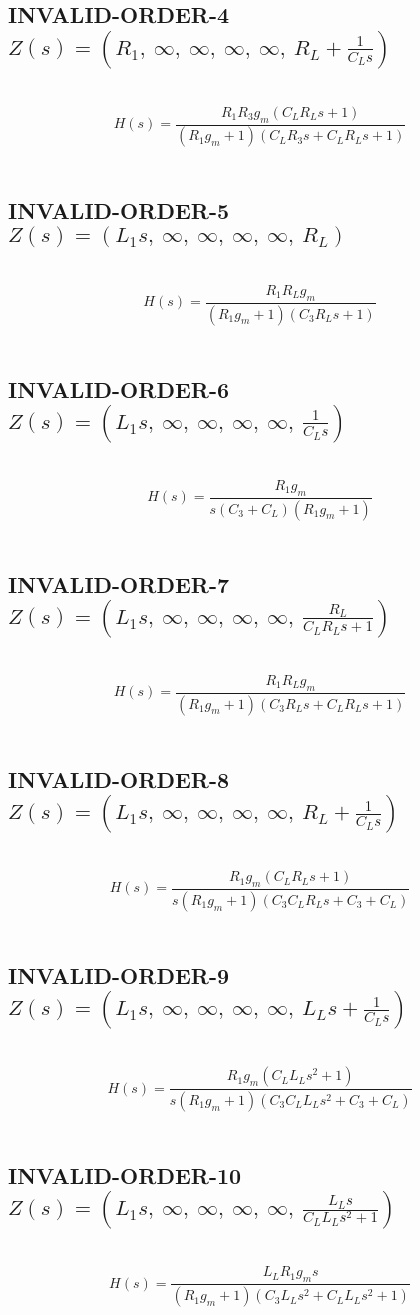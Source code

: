 \documentclass{article}
\begin{document}
\subsection{INVALID-ORDER-4 $Z(s) = \left( R_{1}, \  \infty, \  \infty, \  \infty, \  \infty, \  R_{L} + \frac{1}{C_{L} s}\right)$ } \ 
\textbf{\[H(s) = \frac{R_{1} R_{3} g_{m} \left(C_{L} R_{L} s + 1\right)}{\left(R_{1} g_{m} + 1\right) \left(C_{L} R_{3} s + C_{L} R_{L} s + 1\right)}\] } \ 
\subsection{INVALID-ORDER-5 $Z(s) = \left( L_{1} s, \  \infty, \  \infty, \  \infty, \  \infty, \  R_{L}\right)$ } \ 
\textbf{\[H(s) = \frac{R_{1} R_{L} g_{m}}{\left(R_{1} g_{m} + 1\right) \left(C_{3} R_{L} s + 1\right)}\] } \ 
\subsection{INVALID-ORDER-6 $Z(s) = \left( L_{1} s, \  \infty, \  \infty, \  \infty, \  \infty, \  \frac{1}{C_{L} s}\right)$ } \ 
\textbf{\[H(s) = \frac{R_{1} g_{m}}{s \left(C_{3} + C_{L}\right) \left(R_{1} g_{m} + 1\right)}\] } \ 
\subsection{INVALID-ORDER-7 $Z(s) = \left( L_{1} s, \  \infty, \  \infty, \  \infty, \  \infty, \  \frac{R_{L}}{C_{L} R_{L} s + 1}\right)$ } \ 
\textbf{\[H(s) = \frac{R_{1} R_{L} g_{m}}{\left(R_{1} g_{m} + 1\right) \left(C_{3} R_{L} s + C_{L} R_{L} s + 1\right)}\] } \ 
\subsection{INVALID-ORDER-8 $Z(s) = \left( L_{1} s, \  \infty, \  \infty, \  \infty, \  \infty, \  R_{L} + \frac{1}{C_{L} s}\right)$ } \ 
\textbf{\[H(s) = \frac{R_{1} g_{m} \left(C_{L} R_{L} s + 1\right)}{s \left(R_{1} g_{m} + 1\right) \left(C_{3} C_{L} R_{L} s + C_{3} + C_{L}\right)}\] } \ 
\subsection{INVALID-ORDER-9 $Z(s) = \left( L_{1} s, \  \infty, \  \infty, \  \infty, \  \infty, \  L_{L} s + \frac{1}{C_{L} s}\right)$ } \ 
\textbf{\[H(s) = \frac{R_{1} g_{m} \left(C_{L} L_{L} s^{2} + 1\right)}{s \left(R_{1} g_{m} + 1\right) \left(C_{3} C_{L} L_{L} s^{2} + C_{3} + C_{L}\right)}\] } \ 
\subsection{INVALID-ORDER-10 $Z(s) = \left( L_{1} s, \  \infty, \  \infty, \  \infty, \  \infty, \  \frac{L_{L} s}{C_{L} L_{L} s^{2} + 1}\right)$ } \ 
\textbf{\[H(s) = \frac{L_{L} R_{1} g_{m} s}{\left(R_{1} g_{m} + 1\right) \left(C_{3} L_{L} s^{2} + C_{L} L_{L} s^{2} + 1\right)}\] } \ 
\end{document}
